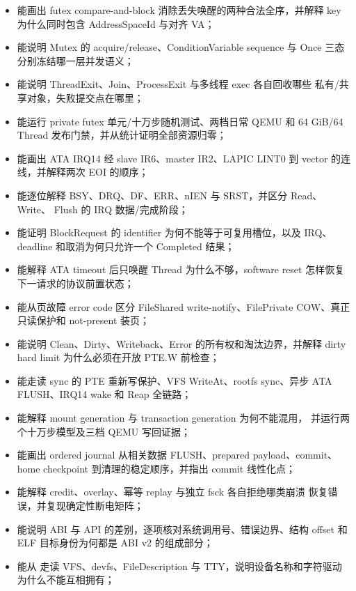 \begin{itemize}
        汇编为什么不能再重载 FS selector；
  \item 能画出 futex compare-and-block 消除丢失唤醒的两种合法全序，并解释
        key 为什么同时包含 AddressSpaceId 与对齐 VA；
  \item 能说明 Mutex 的 acquire/release、ConditionVariable sequence 与
        Once 三态分别冻结哪一层并发语义；
  \item 能说明 ThreadExit、Join、ProcessExit 与多线程 exec 各自回收哪些
        私有/共享对象，失败提交点在哪里；
  \item 能运行 private futex 单元/十万步随机测试、两档日常 QEMU 和
        64 GiB/64 Thread 发布门禁，并从统计证明全部资源归零；
  \item 能画出 ATA IRQ14 经 slave IR6、master IR2、LAPIC LINT0 到
        vector  的连线，并解释两次 EOI 的顺序；
  \item 能逐位解释 BSY、DRQ、DF、ERR、nIEN 与 SRST，并区分 Read、Write、
        Flush 的 IRQ 数据/完成阶段；
  \item 能证明 BlockRequest 的 identifier 为何不能等于可复用槽位，以及
        IRQ、deadline 和取消为何只允许一个 Completed 结果；
  \item 能解释 ATA timeout 后只唤醒 Thread 为什么不够，software reset
        怎样恢复下一请求的协议前置状态；
  \item 能从页故障 error code 区分 FileShared write-notify、FilePrivate
        COW、真正只读保护和 not-present 装页；
  \item 能说明 Clean、Dirty、Writeback、Error 的所有权和淘汰边界，并解释
        dirty hard limit 为什么必须在开放 PTE.W 前检查；
  \item 能走读 sync 的 PTE 重新写保护、VFS WriteAt、rootfs sync、异步
        ATA FLUSH、IRQ14 wake 和 Reap 全链路；
  \item 能解释 mount generation 与 transaction generation 为何不能混用，
        并运行两个十万步模型及三档 QEMU 写回证据；
  \item 能画出 ordered journal 从相关数据 FLUSH、prepared payload、commit、
        home checkpoint 到清理的稳定顺序，并指出 commit 线性化点；
  \item 能解释 credit、overlay、幂等 replay 与独立 fsck 各自拒绝哪类崩溃
        恢复错误，并复现确定性断电矩阵；
  \item 能说明 ABI 与 API 的差别，逐项核对系统调用号、错误边界、结构
        offset 和 ELF 目标身份为何都是 ABI v2 的组成部分；
  \item 能从  走读 VFS、devfs、FileDescription 与
        TTY，说明设备名称和字符驱动为什么不能互相拥有；

\end{itemize}
